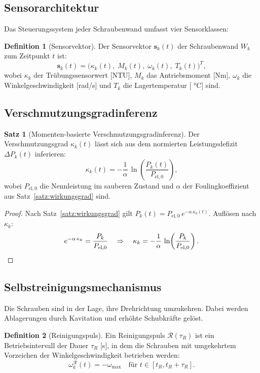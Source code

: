 ﻿\documentclass[a4paper,12pt]{article}
\theoremstyle{definition}
\newtheorem{definition}{Definition}
\newtheorem{satz}{Satz}
\begin{document}
\subsection{Sensorarchitektur}

Das Steuerungssystem jeder Schraubenwand umfasst vier Sensorklassen:

\begin{definition}[Sensorvektor]
Der Sensorvektor $\mathbf{s}_k(t)$ der Schraubenwand $W_k$ zum Zeitpunkt $t$ ist:
\[
  \mathbf{s}_k(t) = \bigl(\kappa_k(t),\; M_k(t),\; \omega_k(t),\; T_k(t)\bigr)^T,
\]
wobei $\kappa_k$ der Trübungssensorwert [NTU], $M_k$ das Antriebsmoment [Nm],
$\omega_k$ die Winkelgeschwindigkeit [rad/s] und $T_k$ die Lagertemperatur [ °C] sind.
\end{definition}

\subsection{Verschmutzungsgradinferenz}

\begin{satz}[Momenten-basierte Verschmutzungsgradinferenz]
\label{satz:infer}
Der Verschmutzungsgrad $\kappa_k(t)$ lässt sich aus dem normierten Leistungsdefizit
$\Delta P_k(t)$ inferieren:
\[
  \kappa_k(t) = -\frac{1}{\alpha}\,\ln\!\left(\frac{P_k(t)}{P_{\mathrm{el},0}}\right),
\]
wobei $P_{\mathrm{el},0}$ die Nennleistung im sauberen Zustand und $\alpha$ der
Foulingkoeffizient aus Satz~\ref{satz:wirkungsgrad} sind.
\end{satz}

\begin{proof}
Nach Satz~\ref{satz:wirkungsgrad} gilt $P_k(t) = P_{\mathrm{el},0}\,e^{-\alpha\,\kappa_k(t)}$.
Auflösen nach $\kappa_k$:
\[
  e^{-\alpha\,\kappa_k} = \frac{P_k}{P_{\mathrm{el},0}} \quad\Rightarrow\quad
  \kappa_k = -\frac{1}{\alpha}\,\ln\!\left(\frac{P_k}{P_{\mathrm{el},0}}\right). \qedhere
\]
\end{proof}

\subsection{Selbstreinigungsmechanismus}

Die Schrauben sind in der Lage, ihre Drehrichtung umzukehren. Dabei werden
Ablagerungen durch Kavitation und erhöhte Schubkräfte gelöst.

\begin{definition}[Reinigungspuls]
Ein Reinigungspuls $\mathcal{R}(\tau_R)$ ist ein Betriebsintervall der Dauer
$\tau_R$ [s], in dem die Schrauben mit umgekehrtem Vorzeichen der Winkelgeschwindigkeit
betrieben werden:
\[
  \omega_k^{\mathcal{R}}(t) = -\omega_{\max}\quad\text{für } t \in [t_R, t_R + \tau_R].
\]
\end{definition}
\end{document}
